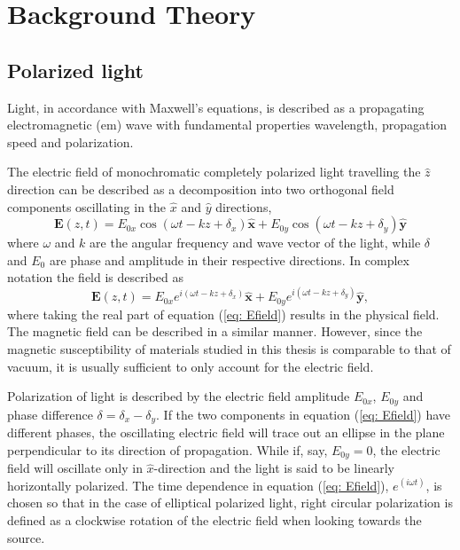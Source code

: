 
\chapter{Background Theory}

\section{Polarized light}
\label{sec:PolarizedLight}
Light, in accordance with Maxwell's equations, is described as a propagating electromagnetic (\ac{em}) wave with fundamental properties wavelength, propagation speed and polarization.  

The electric field of monochromatic completely polarized light travelling the $\hat{z}$ direction can be described as a decomposition into two orthogonal field components oscillating in the $\hat{x}$ and $\hat{y}$ directions,
\begin{equation}
    \mathbf{E}(z,t) = E_{0x}\cos(\omega t - kz + \delta_x)\mathbf{\hat{x}} + E_{0y}\cos(\omega t - kz + \delta_y)\mathbf{\hat{y}}
    \label{eq:cosEfield}
\end{equation} 
where $\omega$ and $k$ are the angular frequency and wave vector of the light, while $\delta$ and $E_0$ are phase and amplitude in their respective directions. In complex notation the field is described as
\begin{equation}
    \mathbf{E}(z,t) = E_{0x}e^{i(\omega t - kz + \delta_x)}\mathbf{\hat{x}} + E_{0y}e^{i(\omega t - kz + \delta_y)}\mathbf{\hat{y}},
    \label{eq: Efield}
\end{equation}
where taking the real part of equation (\ref{eq: Efield}) results in the physical field. The magnetic field can be described in a similar manner. However, since the magnetic susceptibility of materials studied in this thesis is comparable to that of vacuum, it is usually sufficient to only account for the electric field. 

Polarization of light is described by the electric field amplitude $E_{0x}$, $E_{0y}$ and phase difference $\delta = \delta_x-\delta_y$. If the two components in equation (\ref{eq: Efield}) have different phases, the oscillating electric field will trace out an ellipse in the plane perpendicular to its direction of propagation. While if, say, $E_{0y}=0$, the electric field will oscillate only in $\hat{x}$-direction and the light is said to be linearly horizontally polarized\cite{collett}. The time dependence in equation (\ref{eq: Efield}), $e^{(i\omega t)}$, is chosen so that in the case of elliptical polarized light, right circular polarization is defined as a clockwise rotation of the electric field when looking towards the source\cite{hauge}.

